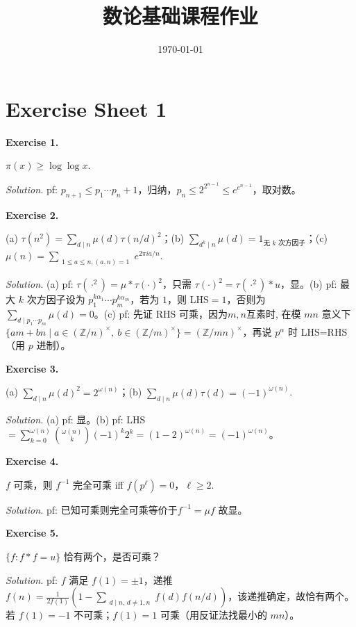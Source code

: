 \documentclass[
	colors = true,
	geometry = b5,
	fontsetup = font-setup-overleaf.tex,
	titlesetup = titles-setup.tex
]{AJbook}
\title{数论基础课程作业}
\author{}
\date{\today}
\newenvironment{sheetexercise}[1]{%
	\par\medskip
	\noindent\textbf{Exercise #1.}\enspace
}{%
	\par\smallskip
}
\newenvironment{solution}{%
	\par\smallskip
	\noindent\textit{Solution.}\enspace
}{%
	\par\smallskip
}
\begin{document}
\maketitle
\mainmatter


\chapter{Exercise Sheet 1}
\begin{sheetexercise}{1}
$\pi(x)\geq\log\log x$.
\end{sheetexercise}
\begin{solution}pf: $p_{n+1}\leq p_1\cdots p_n+1$，归纳，$p_n\leq2^{2^{n-1}}\leq e^{e^{n-1}}$，取对数。\end{solution}

\begin{sheetexercise}{2}
(a) $\tau(n^2)=\sum_{d\mid n}\mu(d)\tau(n/d)^2$；(b) $\sum_{d^k\mid n}\mu(d)=1_{\text{无 }k\text{ 次方因子}}$；(c) $\mu(n)=\sum_{\substack{1\leq a\leq n, (a,n)=1}}e^{2\pi ia/n}$.
\end{sheetexercise}
\begin{solution}(a) pf: $\tau(\cdot^2)=\mu*\tau(\cdot)^2$，只需 $\tau(\cdot)^2=\tau(\cdot^2)*u$，显。(b) pf: 最大 $k$ 次方因子设为 $p_1^{k\alpha_1}\cdots p_m^{k\alpha_m}$，若为 $1$，则 LHS$=1$，否则为 $\sum_{d\mid p_1\cdots p_m}\mu(d)=0$。(c) pf: 先证 RHS 可乘，因为$m,n$互素时, 在模 $mn$ 意义下 $\{am+bn\mid a\in(\mathbb Z/n)^\times,\ b\in(\mathbb Z/m)^\times\}=(\mathbb Z/mn)^\times$，再说 $p^\alpha$ 时 LHS=RHS（用 $p$ 进制）。\end{solution}

\begin{sheetexercise}{3}
(a) $\sum_{d\mid n}\mu(d)^2=2^{\omega(n)}$；(b) $\sum_{d\mid n}\mu(d)\tau(d)=(-1)^{\omega(n)}$.
\end{sheetexercise}
\begin{solution}(a) pf: 显。(b) pf: LHS$=\sum_{k=0}^{\omega(n)}\binom{\omega(n)}k(-1)^k2^k=(1-2)^{\omega(n)}=(-1)^{\omega(n)}$。\end{solution}

\begin{sheetexercise}{4}
$f$ 可乘，则 $f^{-1}$ 完全可乘 iff $f(p^\ell)=0$，$\ell\geq2$.
\end{sheetexercise}
\begin{solution}pf: 已知可乘则完全可乘等价于$f^{-1}=\mu f$ 故显。\end{solution}

\begin{sheetexercise}{5}
$\{f:f*f=u\}$ 恰有两个，是否可乘？
\end{sheetexercise}
\begin{solution}pf: $f$ 满足 $f(1)=\pm1$，递推 $f(n)=\frac1{2f(1)}(1-\sum_{\substack{d\mid n,\,d\neq1,n}}f(d)f(n/d))$，该递推确定，故恰有两个。若 $f(1)=-1$ 不可乘；$f(1)=1$ 可乘（用反证法找最小的 $mn$）。\end{solution}
\end{document}
